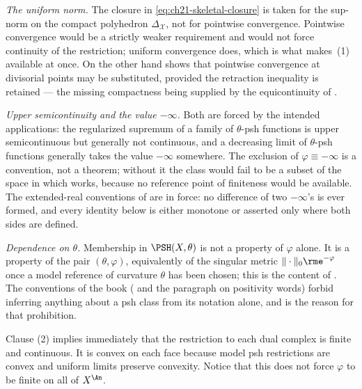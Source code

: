 \emph{The uniform norm.}  The closure in
\eqref{eq:ch21-skeletal-closure} is taken for the sup-norm on the compact
polyhedron $\Delta_{\mathcal X}$, not for pointwise convergence.  Pointwise
convergence would be a strictly weaker requirement and would not force
continuity of the restriction; uniform convergence does, which is what makes
\,(1) available at once.  On the
other hand  shows that pointwise convergence at
divisorial points may be substituted, provided the retraction inequality is
retained --- the missing compactness being supplied by the equicontinuity of
.

\emph{Upper semicontinuity and the value $-\infty$.}  Both are forced by
the intended applications: the regularized supremum of a family of
$\theta$-psh functions is upper semicontinuous but generally not
continuous, and a decreasing limit of $\theta$-psh functions generally
takes the value $-\infty$ somewhere.  The exclusion of
$\varphi\equiv-\infty$ is a convention, not a theorem; without it the
class would fail to be a subset of the space in which
 works, because no reference point of finiteness would
be available.  The extended-real conventions of
 are in force: no difference of two
$-\infty$'s is ever formed, and every identity below is either
monotone or asserted only where both sides are defined.

\emph{Dependence on $\theta$.}  Membership in $\PSH(X,\theta)$ is not a
property of $\varphi$ alone.  It is a property of the pair
$(\theta,\varphi)$, equivalently of the singular metric
$\|\cdot\|_0\rme^{-\varphi}$ once a model reference of curvature
$\theta$ has been chosen; this is the content of
.  The conventions of the book
( and the paragraph on positivity words)
forbid inferring anything about a psh class from its notation alone, and
 is the reason for that prohibition.

Clause (2) implies immediately that the restriction to each dual complex is
finite and continuous.  It is convex on each face because model psh
restrictions are convex and uniform limits preserve convexity.  Notice that
this does not force $\varphi$ to be finite on all of $X^{\An}$.


